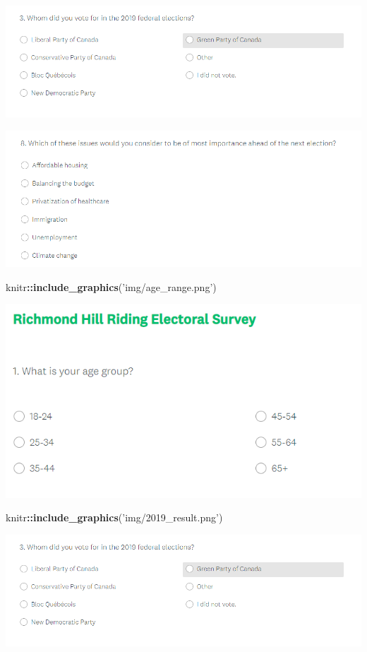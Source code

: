 \documentclass[
]{article}
\newenvironment{Shaded}{\begin{snugshade}}{\end{snugshade}}
\newcommand{\KeywordTok}[1]{\textcolor[rgb]{0.13,0.29,0.53}{\textbf{#1}}}
\newcommand{\NormalTok}[1]{#1}
\newcommand{\OperatorTok}[1]{\textcolor[rgb]{0.81,0.36,0.00}{\textbf{#1}}}
\newcommand{\StringTok}[1]{\textcolor[rgb]{0.31,0.60,0.02}{#1}}
\begin{document}
\includegraphics{img/2019_result.png}

\includegraphics{img/important_issues.png}

\begin{Shaded}
\begin{Highlighting}[]
\NormalTok{knitr}\OperatorTok{::}\KeywordTok{include_graphics}\NormalTok{(}\StringTok{'img/age_range.png'}\NormalTok{)}
\end{Highlighting}
\end{Shaded}

\includegraphics[width=9.83in]{img/age_range}

\begin{Shaded}
\begin{Highlighting}[]
\NormalTok{knitr}\OperatorTok{::}\KeywordTok{include_graphics}\NormalTok{(}\StringTok{'img/2019_result.png'}\NormalTok{)}
\end{Highlighting}
\end{Shaded}

\includegraphics[width=10.43in]{img/2019_result}
\end{document}
